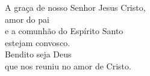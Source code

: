A graça de nosso Senhor Jesus Cristo, \\ amor do pai \\ e a comunhão do Espírito Santo \\ estejam convosco. \\
\RbarRed{} Bendito seja Deus \\ que nos reuniu no amor de Cristo.
\vspace{.2cm} \\
